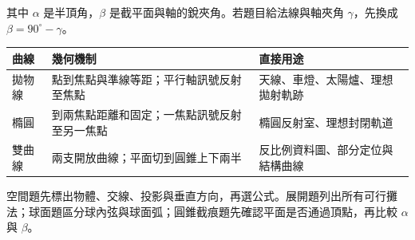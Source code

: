 \documentclass[11pt,a4paper]{article}
\newcounter{none}
\begin{document}
其中 \(\alpha\) 是半頂角，\(\beta\) 是截平面與軸的銳夾角。若題目給法線與軸夾角 \(\gamma\)，先換成 \(\beta=90^\circ-\gamma\)。

{\def\LTcaptype{none} %
\begin{longtable}[]{@{}
  >{\raggedright\arraybackslash}p{}
  >{\raggedright\arraybackslash}p{}
  >{\raggedright\arraybackslash}p{}@{}}
\toprule\noalign{}
\begin{minipage}[b]{\linewidth}\raggedright
曲線
\end{minipage} & \begin{minipage}[b]{\linewidth}\raggedright
幾何機制
\end{minipage} & \begin{minipage}[b]{\linewidth}\raggedright
直接用途
\end{minipage} \\
\midrule\noalign{}
\endhead
\bottomrule\noalign{}
\endlastfoot
拋物線 & 點到焦點與準線等距；平行軸訊號反射至焦點 & 天線、車燈、太陽爐、理想拋射軌跡 \\
橢圓 & 到兩焦點距離和固定；一焦點訊號反射至另一焦點 & 橢圓反射室、理想封閉軌道 \\
雙曲線 & 兩支開放曲線；平面切到圓錐上下兩半 & 反比例資料圖、部分定位與結構曲線 \\
\end{longtable}
}

空間題先標出物體、交線、投影與垂直方向，再選公式。展開題列出所有可行攤法；球面題區分球內弦與球面弧；圓錐截痕題先確認平面是否通過頂點，再比較 \(\alpha\) 與 \(\beta\)。
\end{document}
